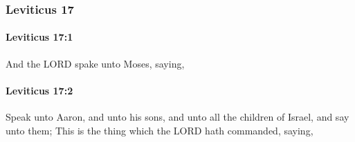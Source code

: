 	\subsubsection{Leviticus 17} %
		\label{LEVITICUS-17}

		\paragraph{Leviticus 17:1} %
			\label{LEVITICUS-17-1}

			And the LORD spake unto Moses, saying,


		\paragraph{Leviticus 17:2} %
			\label{LEVITICUS-17-2}

			Speak unto Aaron, and unto his sons, and unto all the children of Israel, and say unto them; This is the thing which the LORD hath commanded, saying,


